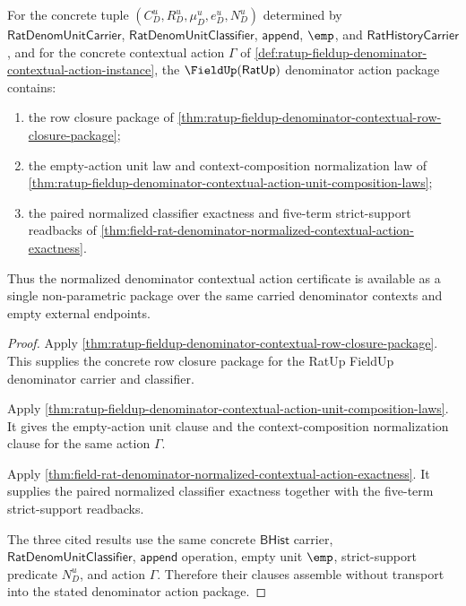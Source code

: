 \begin{theorem}
\label{thm:field-rat-denominator-normalized-contextual-action-package}
For the concrete tuple $(C_D^u,R_D^u,\mu_D^u,e_D^u,N_D^u)$ determined by
$\mathsf{RatDenomUnitCarrier}$, $\mathsf{RatDenomUnitClassifier}$,
$\mathsf{append}$, $\emp$, and $\mathsf{RatHistoryCarrier}$, and for the
concrete contextual action $\Gamma$ of
\autoref{def:ratup-fieldup-denominator-contextual-action-instance}, the
$\FieldUp(\mathsf{RatUp})$ denominator action package contains:
\begin{enumerate}
\item the row closure package of
\autoref{thm:ratup-fieldup-denominator-contextual-row-closure-package};
\item the empty-action unit law and context-composition normalization law of
\autoref{thm:ratup-fieldup-denominator-contextual-action-unit-composition-laws};
\item the paired normalized classifier exactness and five-term strict-support
readbacks of
\autoref{thm:field-rat-denominator-normalized-contextual-action-exactness}.
\end{enumerate}
Thus the normalized denominator contextual action certificate is available as a
single non-parametric package over the same carried denominator contexts and
empty external endpoints.
\end{theorem}
\begin{proof}
Apply
\autoref{thm:ratup-fieldup-denominator-contextual-row-closure-package}. This
supplies the concrete row closure package for the RatUp FieldUp denominator
carrier and classifier.

Apply
\autoref{thm:ratup-fieldup-denominator-contextual-action-unit-composition-laws}.
It gives the empty-action unit clause and the context-composition normalization
clause for the same action $\Gamma$.

Apply
\autoref{thm:field-rat-denominator-normalized-contextual-action-exactness}. It
supplies the paired normalized classifier exactness together with the five-term
strict-support readbacks.

The three cited results use the same concrete $\mathsf{BHist}$ carrier,
$\mathsf{RatDenomUnitClassifier}$, $\mathsf{append}$ operation, empty unit
$\emp$, strict-support predicate $N_D^u$, and action $\Gamma$. Therefore their
clauses assemble without transport into the stated denominator action package.
\end{proof}

